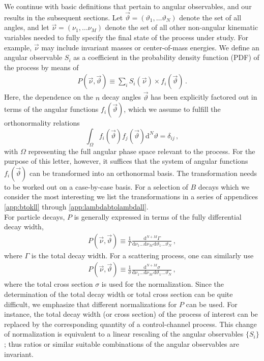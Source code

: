 \documentclass[aps,prd,reprint,nofootinbib,preprintnumbers]{revtex4}
\newcommand{\dd}{\text{d}}
\newcommand{\nuvec}{\vec{\nu}}
\newcommand{\thvec}{\vec{\vartheta}}
\renewcommand{\theta}{\vartheta}
\begin{document}
We continue with basic definitions that pertain to angular observables, and our
results in the subsequent sections. Let $\thvec = (\theta_1, \dots \theta_N)$ denote the set of all
angles, and let $\nuvec = (\nu_1, \dots \nu_M)$ denote the set of all
other non-angular kinematic variables needed to fully specify the
final state of the process under study. For example, $\nuvec$ may
include invariant masses or center-of-mass energies. We define an
angular observable $S_i$ as a coefficient in the probability density
function (PDF) of the process by means of
\begin{align}
    \label{eq:def-P}
    P(\nuvec, \thvec) \equiv \sum_i S_i(\nuvec) \times f_i(\thvec)\,.
\end{align}
Here, the dependence on the $n$ decay angles $\thvec$ has been
explicitly factored out in terms of the angular functions
$f_i(\thvec)$, which we assume to fulfill the orthonormality relations
\begin{equation}
    \label{eq:def-ortho-rel}
    \int_\Omega f_i(\thvec) f_j(\thvec) \dd^N \theta = \delta_{ij}\,,
\end{equation}
with $\Omega$ representing the full angular phase space relevant to the process.
For the purpose of this letter, however, it suffices that the system
of angular functions $f_i(\thvec)$ can be transformed into an
orthonormal basis. The transformation needs to be worked out on a
case-by-case basis. For a selection of $B$ decays which we consider the most interesting
we list the transformations in a series of appendices \ref{app:btokll} through
\ref{app:lambdabtolambdall}.\\


For particle decays, $P$ is generally expressed in terms of the fully differential decay width,
\begin{align}
    \label{eq:def-P-decay}
    P(\nuvec, \thvec) \equiv \frac{1}{\Gamma}\frac{\dd^{N+M}\Gamma}{\dd \nu_1 \dots \dd \nu_M\, \dd \theta_1 \dots \theta_N}\,,
\end{align}
where $\Gamma$ is the total decay width. For a scattering process, one can similarly use
\begin{align}
    \label{eq:def-P-scattering}
    P(\nuvec, \thvec) \equiv \frac{1}{\sigma}\frac{\dd^{N+M}\sigma}{\dd \nu_1 \dots \dd \nu_M\, \dd \theta_1 \dots \theta_N}\,,
\end{align}
where the total cross section $\sigma$ is used for the
normalization. Since the determination of the total decay width or
total cross section can be quite difficult, we emphasize that
different normalizations for $P$ can be used.  For instance, the total
decay width (or cross section) of the process of interest can be
replaced by the corresponding quantity of a control-channel
process. This change of normalization is equivalent to a linear rescaling of
the angular observables $\lbrace S_i\rbrace$; thus ratios or similar suitable combinations
of the angular observables are invariant.\\
\end{document}
